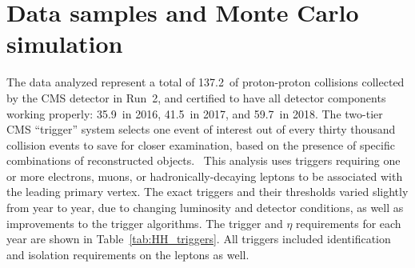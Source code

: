 \section{Data samples and Monte Carlo simulation}
\label{sec:datasets}

The data analyzed represent a total of 137.2~\fbinv of proton-proton collisions
collected by the CMS detector in Run~2, and certified to have all detector components
working properly: 35.9~\fbinv in 2016, 41.5~\fbinv in 2017, and 59.7~\fbinv in 2018.
The two-tier CMS ``trigger'' system selects one event of interest out of every thirty
thousand collision events to save for closer examination, based on the presence of
specific combinations of reconstructed objects.~\cite{CMS_trigger}  This analysis
uses triggers requiring one or more electrons, muons, or hadronically-decaying \Pgt
leptons to be associated with the leading primary vertex. The exact triggers and their
thresholds varied slightly from year to year, due to changing luminosity and detector
conditions, as well as improvements to the trigger algorithms.  The trigger \pt and
$\eta$ requirements for each year are shown in Table~\ref{tab:HH_triggers}.  All
triggers included identification and isolation requirements on the leptons as well.

